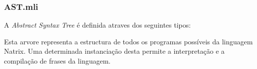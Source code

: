 \subsubsection{AST.mli}
\label{sec2:subsubsec:ast}

A \textit{Abstract Syntax Tree} é definida atraves dos seguintes tipos:


\clearpage



Esta arvore representa a estructura de todos os programas possíveis da linguagem Natrix. Uma determinada instanciação desta permite a interpretação e a compilação de frases da linguagem.
